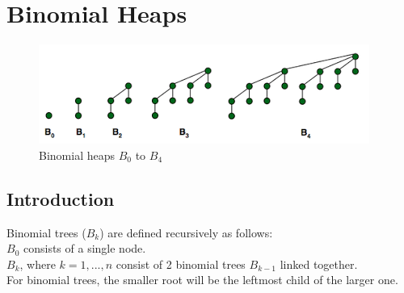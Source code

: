 \documentclass{article}
\begin{document}
\section{Binomial Heaps}
\begin{figure}[htp]
    \includegraphics[width=\textwidth]{biheap.png}
    \caption{Binomial heaps $B_0$ to $B_4$}
    \label{tab:placeholder}
\end{figure}
\subsection{Introduction}
Binomial trees ($B_k$) are defined recursively as follows:\\
$B_0$ consists of a single node.\\
$B_k$, where $k = 1,...,n$ consist of 2 binomial trees $B_{k-1}$ linked together.\\
For binomial trees, the smaller root will be the leftmost child of the larger one.\\
\end{document}
